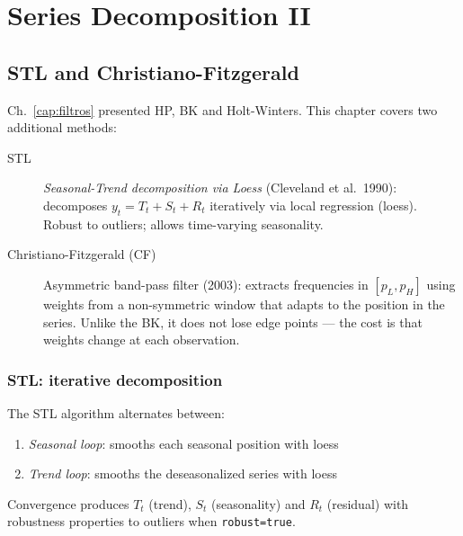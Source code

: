 \chapter{Series Decomposition II}
\label{cap:filtros2}

\section{STL and Christiano-Fitzgerald}

Ch.~\ref{cap:filtros} presented HP, BK and Holt-Winters. This chapter
covers two additional methods:

\begin{description}
  \item[STL] \emph{Seasonal-Trend decomposition via Loess} (Cleveland et al.~1990):
    decomposes $y_t = T_t + S_t + R_t$ iteratively via local regression (loess).
    Robust to outliers; allows time-varying seasonality.

  \item[Christiano-Fitzgerald (CF)] Asymmetric band-pass filter (2003):
    extracts frequencies in $[p_L, p_H]$ using weights from a
    non-symmetric window that adapts to the position in the series. Unlike the BK, it
    does not lose edge points — the cost is that weights change at each observation.
\end{description}

\subsection*{STL: iterative decomposition}

The STL algorithm alternates between:
\begin{enumerate}
  \item \emph{Seasonal loop}: smooths each seasonal position with loess
  \item \emph{Trend loop}: smooths the deseasonalized series with loess
\end{enumerate}
Convergence produces $T_t$ (trend), $S_t$ (seasonality) and $R_t$ (residual)
with robustness properties to outliers when \texttt{robust=true}.

